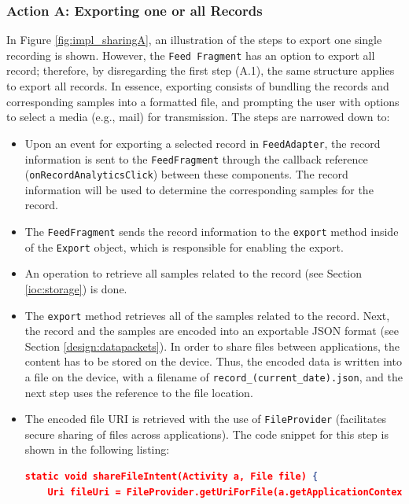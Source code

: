 \subsubsection{Action A: Exporting one or all Records}
In Figure \ref{fig:impl_sharingA}, an illustration of the steps to export one single recording is shown. However, the \verb|Feed Fragment| has an option to export all record; therefore, by disregarding the first step (A.1), the same structure applies to export all records. In essence, exporting consists of bundling the records and corresponding samples into a formatted file, and prompting the user with options to select a media (e.g., mail) for transmission. The steps are narrowed down to: 

\begin{itemize}
    \item[A.1] Upon an event for exporting a selected record in \verb|FeedAdapter|, the record information is sent to the \verb|FeedFragment| through the callback reference (\verb|onRecordAnalyticsClick|) between these components. The record information will be used to determine the corresponding samples for the record.
    \item[A.2] The \verb|FeedFragment| sends the record information to the \verb|export| method inside of the \verb|Export| object, which is responsible for enabling the export. 
    \item[A.3] An operation to retrieve all samples related to the record (see Section \ref{ioc:storage}) is done. 
    \item[A.4] The \verb|export| method retrieves all of the samples related to the record. Next, the record and the samples are encoded into an exportable JSON format (see Section \ref{design:datapackets}). In order to share files between applications, the content has to be stored on the device. Thus, the encoded data is written into a file on the device, with a filename of \verb|record_(current_date).json|, and the next step uses the reference to the file location. 
    \item[A.5] The encoded file URI is retrieved with the use of \verb|FileProvider| (facilitates secure sharing of files across applications). The code snippet for this step is shown in the following listing: 
\begin{lstlisting}[language=json, caption={}, captionpos=b]
static void shareFileIntent(Activity a, File file) {
    Uri fileUri = FileProvider.getUriForFile(a.getApplicationContext(), a.getApplicationContext().getPackageName() + ".provider", file);


\end{lstlisting}
\end{itemize}
